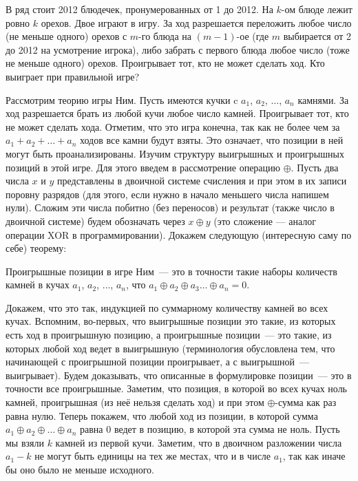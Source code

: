 \problem
{}
В ряд стоит 2012 блюдечек, пронумерованных от 1 до 2012.
На $k$-ом блюде лежит ровно $k$ орехов.
Двое играют в игру.
За ход разрешается переложить любое число (не меньше одного) орехов с $m$-го
блюда на $(m - 1)$-ое (где $m$ выбирается от 2 до 2012 на усмотрение игрока),
либо забрать с первого блюда любое число (тоже не меньше одного) орехов.
Проигрывает тот, кто не может сделать ход.
Кто выиграет при правильной игре?

\solution
Рассмотрим теорию игры Ним.
Пусть имеются кучки c $a_1$, $a_2$, $\ldots$, $a_n$ камнями.
За ход разрешается брать из любой кучи любое число камней.
Проигрывает тот, кто не может сделать хода.
Отметим, что это игра конечна, так как не более чем за
$a_1 + a_2 + \ldots + a_n$ ходов все камни будут взяты.
Это означает, что позиции в ней могут быть проанализированы.
Изучим структуру выигрышных и проигрышных позиций в этой игре.
Для этого введем в рассмотрение операцию $\oplus$.
Пусть два числа $x$ и $y$ представлены в двоичной системе счисления и при этом
в их записи поровну разрядов
(для этого, если нужно в начало меньшего числа напишем нули).
Сложим эти числа побитно (без переносов) и результат
(также число в двоичной системе) будем обозначать через $x \oplus y$
(это сложение --- аналог операции XOR в программировании).
Докажем следующую (интересную саму по себе) теорему:
\par
\theorem
Проигрышные позиции в игре Ним~--- это в точности такие наборы количеств
камней в кучах $a_1$, $a_2$, $\ldots$, $a_n$, что
$a_1 \oplus a_2 \oplus a_3 \ldots \oplus a_n = 0$.
\par
Докажем, что это так, индукцией по суммарному количеству камней во всех кучах.
Вспомним, во-первых, что выигрышные позиции это такие, из которых есть ход
в проигрышную позицию, а проигрышные позиции~--- это такие, из которых любой
ход ведет в выигрышную
(терминология обусловлена тем, что начинающей с проигрышной позиции
проигрывает, а с выигрышной~--- выигрывает).
Будем доказывать, что описанные в формулировке позиции~--- это в точности все
проигрышные.
Заметим, что позиция, в которой во всех кучах ноль камней, проигрышная
(из неё нельзя сделать ход) и при этом $\oplus$-сумма как раз равна нулю.
Теперь покажем, что любой ход из позиции, в которой сумма
$a_1 \oplus a_2 \oplus \ldots \oplus a_n$ равна 0 ведет в позицию, в которой
эта сумма не ноль.
Пусть мы взяли $k$ камней из первой кучи.
Заметим, что в двоичном разложении числа $a_1 - k$ не могут быть единицы на тех
же местах, что и в числе $a_1$, так как иначе бы оно было не меньше исходного.

